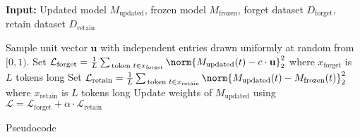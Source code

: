\begin{algorithm}[t!]
	\begin{algorithmic}[1]
		\STATE \textbf{Input:} Updated model $M_\text{updated}$, frozen model $M_\text{frozen}$, forget dataset $D_\text{forget}$, retain dataset $D_\text{retain}$ 
           
        \STATE Sample unit vector $\mathbf{u}$ with independent entries drawn uniformly at random from $[0, 1)$.
        \STATE Set $\mathcal{L}_\text{forget} = \frac{1}{L}\sum_{\,\text{token } t \in x_\text{forget}} \norm{M_\text{updated}(t) -c \cdot \mathbf{u}}_2^2 $ where $x_\text{forget}$ is $L$ tokens long
        \STATE Set $\mathcal{L}_\text{retain} = \frac{1}{L} \sum_{\,\text{token } t \in x_\text{retain}}\norm{M_\text{updated}(t) - M_\text{frozen}(t)}_2^2$ where $x_\text{retain}$ is $L$ tokens long
        \STATE Update weights of $M_\text{updated}$ using $\mathcal{L} = \mathcal{L}_\text{forget} + \alpha \cdot \mathcal{L}_\text{retain}$ 
		\ENDFOR
        \EndFunction

		\end{algorithmic}
	\caption{\method{} Pseudocode}
	\label{algo:cut}
\end{algorithm}
